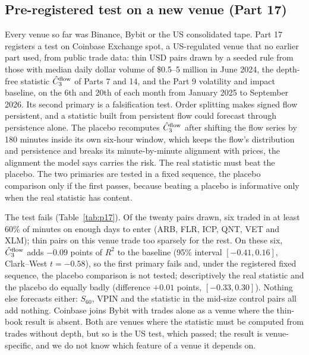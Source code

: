 \documentclass[12pt]{article}
\theoremstyle{definition}
\theoremstyle{remark}
\begin{document}
\subsection{Pre-registered test on a new venue (Part 17)}\label{sec:p17}
Every venue so far was Binance, Bybit or the US consolidated tape. Part 17 registers a test on Coinbase Exchange spot, a US-regulated venue that no earlier part used, from public trade data: thin USD pairs drawn by a seeded rule from those with median daily dollar volume of \$0.5--5 million in June 2024, the depth-free statistic $\hat C_3^{\rm flow}$ of Parts 7 and 14, and the Part 9 volatility and impact baseline, on the 6th and 20th of each month from January 2025 to September 2026. Its second primary is a falsification test. Order splitting makes signed flow persistent, and a statistic built from persistent flow could forecast through persistence alone. The placebo recomputes $\hat C_3^{\rm flow}$ after shifting the flow series by 180 minutes inside its own six-hour window, which keeps the flow's distribution and persistence and breaks its minute-by-minute alignment with prices, the alignment the model says carries the risk. The real statistic must beat the placebo. The two primaries are tested in a fixed sequence, the placebo comparison only if the first passes, because beating a placebo is informative only when the real statistic has content.

The test fails (Table~\ref{tab:p17}). Of the twenty pairs drawn, six traded in at least 60\% of minutes on enough days to enter (ARB, FLR, ICP, QNT, VET and XLM); thin pairs on this venue trade too sparsely for the rest. On these six, $\hat C_3^{\rm flow}$ adds $-0.09$ points of $R^2$ to the baseline (95\% interval $[-0.41,0.16]$, Clark--West $t=-0.58$), so the first primary fails and, under the registered fixed sequence, the placebo comparison is not tested; descriptively the real statistic and the placebo do equally badly (difference $+0.01$ points, $[-0.33,0.30]$). Nothing else forecasts either: $S_{60}$, VPIN and the statistic in the mid-size control pairs all add nothing. Coinbase joins Bybit with trades alone as a venue where the thin-book result is absent. Both are venues where the statistic must be computed from trades without depth, but so is the US test, which passed; the result is venue-specific, and we do not know which feature of a venue it depends on.
\end{document}
